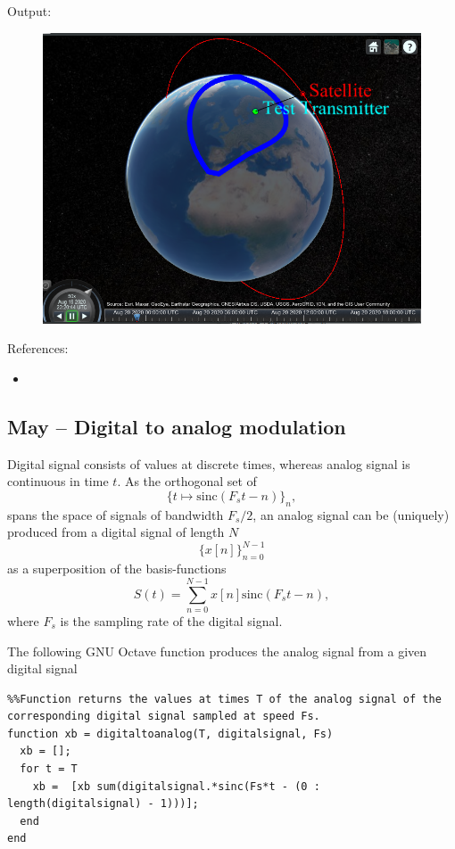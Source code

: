 \documentclass{article}
\begin{document}
Output:
\begin{figure}
  \includegraphics[width=\linewidth]{stk.png}
\end{figure}


References:
\begin{itemize}
\item {}
\end{itemize}

\subsection{May – Digital to analog modulation}
Digital signal consists of values at discrete times, whereas analog signal is continuous in time $t$. As the orthogonal set of 
$$
\{t \mapsto \text{sinc}(F_s t - n)\}_n,
$$
spans the space of signals of bandwidth $F_s/2$, an analog signal can be (uniquely) produced from a digital signal of length $N$ 
$$
\{ x[n]\}_{n=0}^{N-1}
$$
as a superposition of the  basis-functions
$$
S(t) =\sum_{n = 0}^{N-1} x[n]\text{sinc}(F_s t - n),
$$
where $F_s$ is the sampling rate of the digital signal.

The following GNU Octave function produces the analog signal from a given digital signal

\begin{verbatim}
%%Function returns the values at times T of the analog signal of the corresponding digital signal sampled at speed Fs.
function xb = digitaltoanalog(T, digitalsignal, Fs)
  xb = [];
  for t = T
    xb =  [xb sum(digitalsignal.*sinc(Fs*t - (0 : length(digitalsignal) - 1)))];
  end
end
\end{verbatim}
\end{document}
